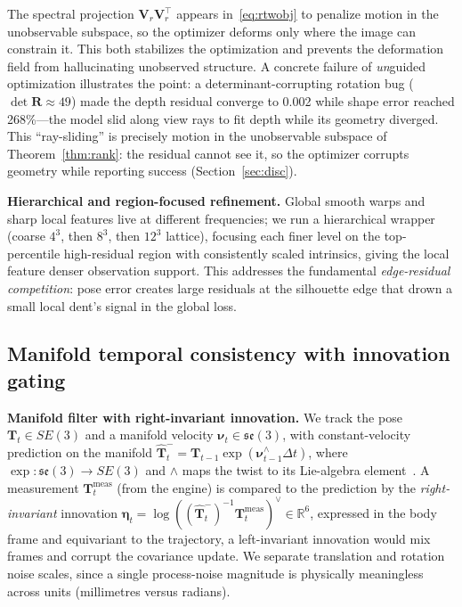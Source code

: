 \documentclass[9pt,twoside,web]{ieeecolor2}
\begin{document}
The spectral projection $\mathbf{V}_{r}\mathbf{V}_{r}^{\top}$ appears in~\eqref{eq:rtwobj} to penalize motion in the unobservable subspace, so the optimizer deforms only where the image can constrain it. This both stabilizes the optimization and prevents the deformation field from hallucinating unobserved structure. A concrete failure of \emph{un}guided optimization illustrates the point: a determinant-corrupting rotation bug ($\det\mathbf{R}\approx49$) made the depth residual converge to 0.002 while shape error reached 268\%---the model slid along view rays to fit depth while its geometry diverged. This ``ray-sliding'' is precisely motion in the unobservable subspace of Theorem~\ref{thm:rank}: the residual cannot see it, so the optimizer corrupts geometry while reporting success (Section~\ref{sec:disc}).

\textbf{Hierarchical and region-focused refinement.} Global smooth warps and sharp local features live at different frequencies; we run a hierarchical wrapper (coarse $4^{3}$, then $8^{3}$, then $12^{3}$ lattice), focusing each finer level on the top-percentile high-residual region with consistently scaled intrinsics, giving the local feature denser observation support. This addresses the fundamental \emph{edge-residual competition}: pose error creates large residuals at the silhouette edge that drown a small local dent's signal in the global loss.

\subsection{Manifold temporal consistency with innovation gating}\label{sec:kalman}

\textbf{Manifold filter with right-invariant innovation.} We track the pose $\mathbf{T}_{t}\in SE(3)$ and a manifold velocity $\boldsymbol{\nu}_{t}\in\mathfrak{se}(3)$, with constant-velocity prediction on the manifold $\hat{\mathbf{T}}_{t}^{-}=\mathbf{T}_{t-1}\exp(\boldsymbol{\nu}_{t-1}^{\wedge}\Delta t)$, where $\exp:\mathfrak{se}(3)\to SE(3)$ and $\wedge$ maps the twist to its Lie-algebra element~\cite{sola2018lie}. A measurement $\mathbf{T}_{t}^{\mathrm{meas}}$ (from the engine) is compared to the prediction by the \emph{right-invariant} innovation $\boldsymbol{\eta}_{t}=\log((\hat{\mathbf{T}}_{t}^{-})^{-1}\mathbf{T}_{t}^{\mathrm{meas}})^{\vee}\in\mathbb{R}^{6}$, expressed in the body frame and equivariant to the trajectory, a left-invariant innovation would mix frames and corrupt the covariance update. We separate translation and rotation noise scales, since a single process-noise magnitude is physically meaningless across units (millimetres versus radians).
\end{document}
